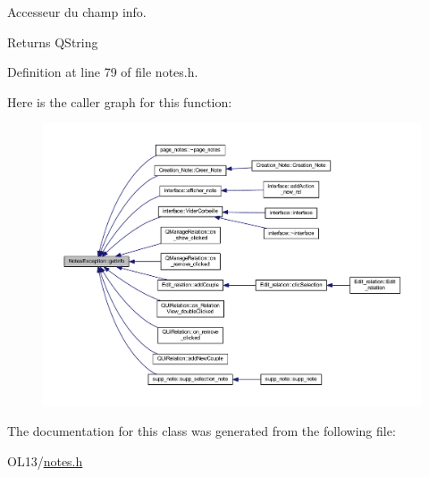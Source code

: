 Accesseur du champ info. 

\begin{DoxyReturn}{Returns}
Q\+String 
\end{DoxyReturn}


Definition at line 79 of file notes.\+h.

Here is the caller graph for this function\+:\nopagebreak
\begin{figure}[H]
\begin{center}
\leavevmode
\includegraphics[width=350pt]{class_notes_exception_a3c595994b69172290b548fdac074248d_icgraph}
\end{center}
\end{figure}


The documentation for this class was generated from the following file\+:\begin{DoxyCompactItemize}
\item 
O\+L13/\hyperlink{notes_8h}{notes.\+h}\end{DoxyCompactItemize}
